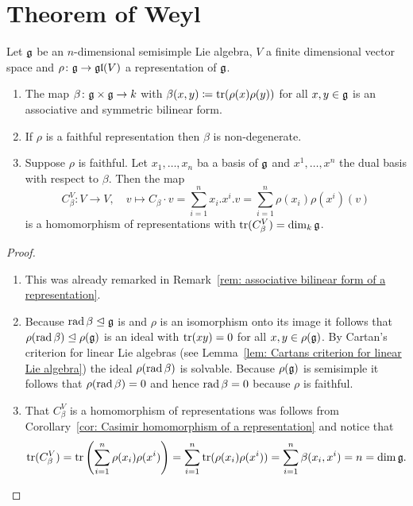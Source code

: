 \section{Theorem of Weyl}


\begin{lem}\label{lem: Casimirs endomorphism for Weyl}
 Let $\mathfrak{g}$ be an $n$-dimensional semisimple Lie algebra, $V$ a finite dimensional vector space and $\rho \colon \mathfrak{g} \to \mathfrak{gl}(V)$ a representation of $\mathfrak{g}$.
 \begin{enumerate}
  \item
   The map $\beta \colon \mathfrak{g} \times \mathfrak{g} \to k$ with $\beta(x,y) \coloneqq \operatorname{tr}(\rho(x)\rho(y))$ for all $x,y \in \mathfrak{g}$ is an associative and symmetric bilinear form.
  \item
   If $\rho$ is a faithful representation then $\beta$ is non-degenerate.
  \item
   Suppose $\rho$ is faithful. Let $x_1, \dotsc, x_n$ ba a basis of $\mathfrak{g}$ and $x^1, \dotsc, x^n$ the dual basis with respect to $\beta$. Then the map
   \[
    C_\beta^V \colon V \to V,
    \quad
    v \mapsto C_\beta \cdot v = \sum_{i=1}^n x_i.x^i.v = \sum_{i=1}^n \rho(x_i)\rho(x^i)(v)
   \]
   is a homomorphism of representations with $\operatorname{tr}(C_\beta^V) = \dim_k \mathfrak{g}$.
 \end{enumerate}
\end{lem}
\begin{proof}
 \begin{enumerate}[leftmargin=*]
  \item
   This was already remarked in Remark~\ref{rem: associative bilinear form of a representation}.
  \item
   Because $\operatorname{rad} \beta \trianglelefteq \mathfrak{g}$ is and $\rho$ is an isomorphism onto its image it follows that $\rho(\operatorname{rad} \beta) \trianglelefteq \rho(\mathfrak{g})$ is an ideal with $\operatorname{tr}(xy) = 0$ for all $x,y \in \rho(\mathfrak{g})$. By Cartan’s criterion for linear Lie algebras (see Lemma~\ref{lem: Cartans criterion for linear Lie algebra}) the ideal $\rho(\operatorname{rad} \beta)$ is solvable. Because $\rho(\mathfrak{g})$ is semisimple it follows that $\rho(\operatorname{rad} \beta) = 0$ and hence $\operatorname{rad} \beta = 0$ because $\rho$ is faithful.
  \item
   That $C_\beta^V$ is a homomorphism of representations was follows from Corollary~\ref{cor: Casimir homomorphism of a representation} and notice that
   \[
    \operatorname{tr}(C_\beta^V)
    = \operatorname{tr}\left( \sum_{i=1}^n \rho(x_i)\rho(x^i) \right)
    = \sum_{i=1}^n \operatorname{tr}(\rho(x_i)\rho(x^i))
    = \sum_{i=1}^n \beta(x_i, x^i)
    = n
    = \dim \mathfrak{g}.
    \qedhere
   \]
 \end{enumerate}
\end{proof}


